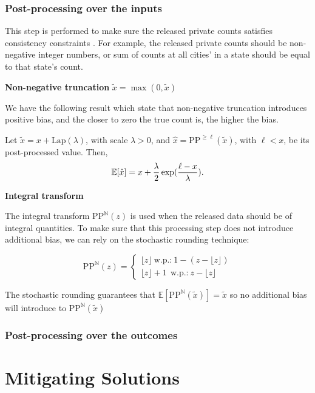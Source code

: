 \subsubsection*{Post-processing over the inputs}
This step is performed to make sure the released private counts satisfies consistency constraints \cite{cohen2021census}. For example, the released private counts should be non-negative integer numbers, or sum of counts at all cities' in a state should be equal to that state's count.


\noindent \textbf{Non-negative truncation} $\tilde{x} = \max(0, \tilde{x}) $

We have the following result which state that non-negative truncation introduces positive bias, and the closer to zero the true count is, the higher the bias.
\begin{theorem}
	\label{lem:exp_clipped_lap}
	Let $\tilde{x} = x + \mbox{Lap}(\lambda)$, with scale $\lambda > 0$,
	and $\hat{x} = \text{PP}^{\geq \ell}(\tilde{x})$, with $\ell < x$,
	be its post-processed value. Then,
	$$
	\mathbb{E}[\hat{x}] = x + \frac{\lambda}{2} \exp(\frac{\ell - x}{\lambda} ).
	$$
\end{theorem}


\noindent \textbf{Integral transform}

The integral transform $\text{PP}^{\mathbb{N}}(z)$ is used when the released data should be of integral quantities. To make sure that this processing step does not introduce additional bias, we can rely on the stochastic rounding technique:

\begin{equation}
	\text{PP}^{\mathbb{N}}(z) = \begin{cases}
									\lfloor z \rfloor   \ \mbox{w.p.:} \  1 -(z- \lfloor z \rfloor ) \\
									\lfloor z \rfloor  +1 \ \ \mbox{w.p.:} \  z - \lfloor z \rfloor
	\end{cases}
\end{equation}


The stochastic rounding guarantees that $\mathbb{E} [\text{PP}^{\mathbb{N}}(\tilde{x})] = \tilde{x} $ so no additional bias will introduce to $\text{PP}^{\mathbb{N}}(\tilde{x})$


\subsubsection*{Post-processing over the outcomes}

\section*{Mitigating Solutions}
